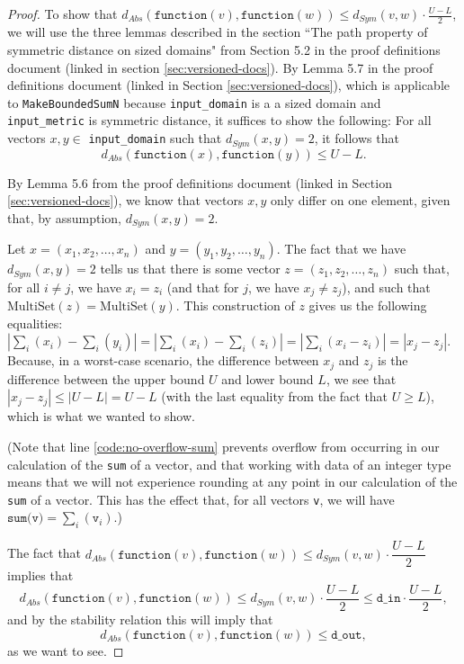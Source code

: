 \documentclass[11pt,a4paper]{article}
\theoremstyle{definition}
\newcommand{\MultiSet}{\mathrm{MultiSet}}
\newcommand{\din}{\texttt{d\_in}}
\newcommand{\dout}{\texttt{d\_out}}
\newcommand{\function}{\texttt{function}}
\begin{document}
\begin{proof}
    
    To show that $d_{Abs}(\function(v), \function(w)) \leq d_{Sym}(v, w) \cdot \frac{U-L}{2}$, we will use the three lemmas described in the section ``The path property of symmetric distance on sized domains" from Section 5.2 in the proof definitions document (linked in section \ref{sec:versioned-docs}). By Lemma 5.7 in the proof definitions document (linked in Section \ref{sec:versioned-docs}), which is applicable to \texttt{MakeBoundedSumN} because \texttt{input\_domain} is a a sized domain and \texttt{input\_metric} is symmetric distance, it suffices to show the following: For all vectors $x, y \in$ \texttt{input\_domain} such that $d_{Sym}(x, y) = 2$, it follows that 
    \[
    d_{Abs}(\texttt{function}(x), \texttt{function}(y)) \leq U-L.
    \]
    
    By Lemma 5.6 from the proof definitions document (linked in Section \ref{sec:versioned-docs}), we know that vectors $x, y$ only differ on one element, given that, by assumption, $d_{Sym}(x, y) = 2$.
    
    Let $x = (x_1,x_2,\ldots,x_n)$ and $y = (y_1,y_2,\ldots,y_n)$. The fact that we have $d_{Sym}(x, y) = 2$ tells us that there is some vector $z = (z_1,z_2,\ldots,z_n)$ such that, for all $i\neq j$, we have $x_i=z_i$ (and that for $j$, we have $x_j \neq z_j$), and such that $\MultiSet(z)=\MultiSet(y)$. This construction of $z$ gives us the following equalities: $|\sum_i(x_i) - \sum_i(y_i)| = |\sum_i(x_i)-\sum_i(z_i)| = |\sum_i(x_i-z_i)| = |x_j-z_j|$. Because, in a worst-case scenario, the difference between $x_j$ and $z_j$ is the difference between the upper bound $U$ and lower bound $L$, we see that $|x_j-z_j|\leq |U-L| = U-L$ (with the last equality from the fact that $U\geq L$), which is what we wanted to show.
    
    (Note that line \ref{code:no-overflow-sum} prevents overflow from occurring in our calculation of the \texttt{sum} of a vector, and that working with data of an integer type means that we will not experience rounding at any point in our calculation of the \texttt{sum} of a vector. This has the effect that, for all vectors \texttt{v}, we will have $\texttt{sum(v)} = \sum_i(\texttt{v}_i)$.)
    
    
    
    
    The fact that $d_{Abs}(\function(v), \function(w)) \leq d_{Sym}(v, w) \cdot \dfrac{U-L}{2}$ implies that
    \begin{equation}\label{eq:abs1}
        d_{Abs}(\function(v), \function(w)) \leq d_{Sym}(v, w) \cdot \dfrac{U-L}{2} \leq \din \cdot \dfrac{U-L}{2},
    \end{equation}
    and by the stability relation this will imply that
    \begin{equation}\label{eq:abs2}
        d_{Abs}(\function(v), \function(w)) \leq \dout,
    \end{equation}
    as we want to see. 
\end{proof}
\end{document}
